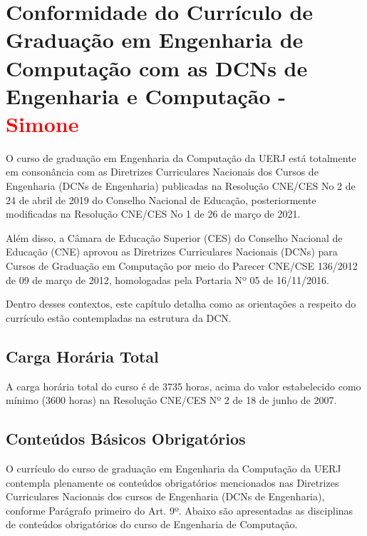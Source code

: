 \chapter{Conformidade do Currículo de Graduação em Engenharia de Computação
com as DCNs de Engenharia e Computação - \textcolor{red}{Simone}}


O curso de graduação em Engenharia da Computação da UERJ está totalmente em
consonância com as Diretrizes Curriculares Nacionais dos Cursos de Engenharia (DCNs
de Engenharia) publicadas na Resolução CNE/CES No 2 de 24 de abril de 2019 do
Conselho Nacional de Educação, posteriormente modificadas na Resolução CNE/CES No
1 de 26 de março de 2021. 

Além disso, a Câmara de Educação Superior (CES) do Conselho Nacional de Educação (CNE) aprovou as Diretrizes Curriculares Nacionais (DCNs) para Cursos 
de Graduação em Computação por meio do Parecer CNE/CSE 136/2012 de 09 de março de 2012, homologadas pela Portaria Nº 05 de 16/11/2016.


Dentro desses contextos, este capítulo detalha como as orientações a
respeito do currículo estão contempladas na estrutura da DCN.

\section{Carga Horária Total}

A carga horária total do curso é de 3735 horas, acima do valor estabelecido como 
mínimo (3600 horas) na Resolução CNE/CES Nº 2 de 18 de junho de 2007.

\section{Conteúdos Básicos Obrigatórios}

O currículo do curso de graduação em Engenharia da Computação da UERJ contempla plenamente os conteúdos obrigatórios mencionados nas Diretrizes Curriculares Nacionais dos cursos de Engenharia (DCNs de Engenharia), conforme Parágrafo primeiro do Art. 9º. Abaixo são apresentadas as disciplinas de conteúdos obrigatórios do curso de Engenharia de Computação.


